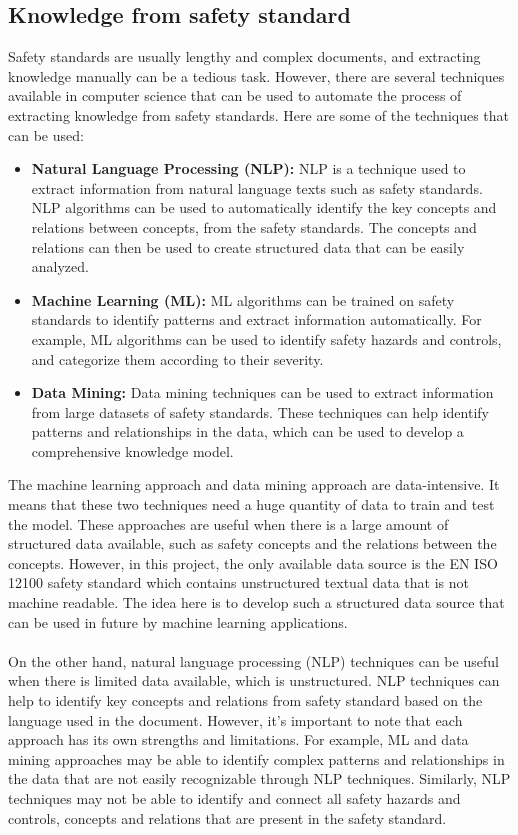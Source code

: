 \subsection{Knowledge from safety standard}
Safety standards are usually lengthy and complex documents, and extracting knowledge manually can be a tedious task. However, there are several techniques available in computer science that can be used to automate the process of extracting knowledge from safety standards. Here are some of the techniques that can be used:
\begin{itemize}
    \item \textbf{Natural Language Processing (NLP):} NLP is a technique used to extract information from natural language texts such as safety standards. NLP algorithms can be used to automatically identify the key concepts and relations between concepts, from the safety standards. The concepts and relations can then be used to create structured data that can be easily analyzed.
    \item \textbf{Machine Learning (ML):} ML algorithms can be trained on safety standards to identify patterns and extract information automatically. For example, ML algorithms can be used to identify safety hazards and controls, and categorize them according to their severity.
    \item \textbf{Data Mining:} Data mining techniques can be used to extract information from large datasets of safety standards. These techniques can help identify patterns and relationships in the data, which can be used to develop a comprehensive knowledge model.
\end{itemize}

The machine learning approach and data mining approach are data-intensive. It means that these two techniques need a huge quantity of data to train and test the model. These approaches are useful when there is a large amount of structured data available, such as safety concepts and the relations between the concepts. However, in this project, the only available data source is the EN ISO 12100 safety standard which contains unstructured textual data that is not machine readable. The idea here is to develop such a structured data source that can be used in future by machine learning applications.

\paragraph{} On the other hand, natural language processing (NLP) techniques can be useful when there is limited data available, which is unstructured. NLP techniques can help to identify key concepts and relations from safety standard based on the language used in the document. However, it's important to note that each approach has its own strengths and limitations. For example, ML and data mining approaches may be able to identify complex patterns and relationships in the data that are not easily recognizable through NLP techniques. Similarly, NLP techniques may not be able to identify and connect all safety hazards and controls, concepts and relations that are present in the safety standard.

